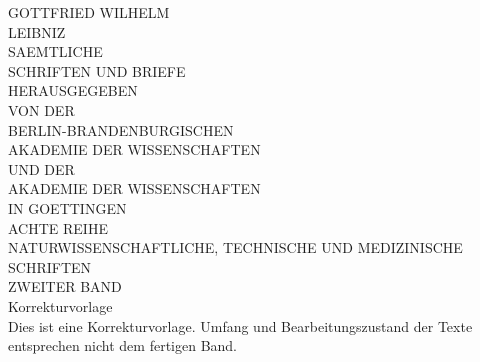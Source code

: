\documentclass[fontsize=10pt,twoside,DIV=calc,BCOR0mm,headings=small,numbers=enddot,headinclude=false,footinclude=true,
openany]{scrbook}
\begin{document}
        \begin{titlepage}
        \begin{center}
        {\huge GOTTFRIED WILHELM}\\
        \vspace*{7.5mm}
        {\Huge LEIBNIZ}\\
        \vspace*{10.5mm}
        {\Large SAEMTLICHE\\
        SCHRIFTEN UND BRIEFE}\\
        \vspace*{13mm}
        {\large HERAUSGEGEBEN\\
        VON DER}\\
        \vspace*{6.5mm}
        {\Large BERLIN-BRANDENBURGISCHEN\\
        AKADEMIE DER WISSENSCHAFTEN}\\
        {\large UND DER}\\
        {\Large AKADEMIE DER WISSENSCHAFTEN\\
        IN GOETTINGEN\\
        \vspace*{16mm}
        ACHTE REIHE}\\
        {\large NATURWISSENSCHAFTLICHE, TECHNISCHE UND MEDIZINISCHE SCHRIFTEN}\\
        \vspace*{5.5mm}
        {\Large ZWEITER BAND}\\
        Korrekturvorlage\\
        \vspace*{6mm}
        \large{Dies ist eine Korrekturvorlage. Umfang und Bearbeitungszustand der Texte entsprechen nicht dem fertigen Band.}\\ %
        \end{center}
        \end{titlepage}


\clearpage{\pagestyle{empty}\cleardoublepage}
\end{document}
